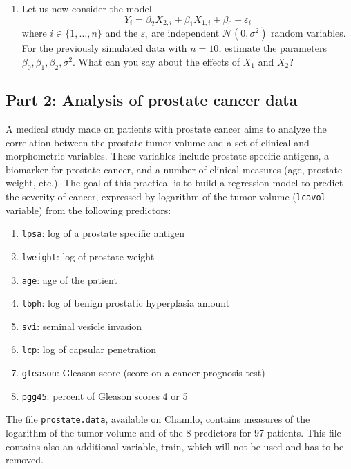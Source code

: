 \documentclass[12pt,a4paper]{article}
\newcommand{\code}[1]{\texttt{#1}}
\begin{document}
\begin{enumerate}
\item Let us now consider the model
$$
Y_i = \beta_2 X_{2, i} + \beta_1 X_{1, i} + \beta_0 + \varepsilon_i
$$
where $i \in \{1,\dots, n\}$ and the $\varepsilon_i$ are independent $\mathcal{N}(0, \sigma^2)$ random variables. For the previously simulated data with $n = 10$, estimate the parameters $\beta_0, \beta_1, \beta_2, \sigma^2$. What can you say about the effects of $X_1$ and $X_2$?
\end{enumerate}

\newpage
\subsection*{Part 2: Analysis of prostate cancer data}

A medical study made on patients with prostate cancer aims to analyze the correlation
between the prostate tumor volume and a set of clinical and morphometric variables. These
variables include prostate specific antigens, a biomarker for prostate cancer, and a number of clinical measures (age, prostate weight, etc.). The goal of this practical is to build a regression model to predict the severity of cancer, expressed by logarithm of the tumor volume (\code{lcavol} variable) from the following predictors:
\begin{enumerate}
\itemsep0em
\item[] \code{lpsa}: log of a prostate specific antigen
\item[] \code{lweight}: log of prostate weight
\item[] \code{age}: age of the patient
\item[] \code{lbph}: log of benign prostatic hyperplasia amount
\item[] \code{svi}: seminal vesicle invasion
\item[] \code{lcp}: log of capsular penetration
\item[] \code{gleason}: Gleason score (score on a cancer prognosis test)
\item[] \code{pgg45}: percent of Gleason scores 4 or 5
\end{enumerate}
The file \code{prostate.data}, available on Chamilo, contains measures of the logarithm of the tumor volume and of the 8 predictors for 97 patients. This file contains also an additional variable, train, which will not be used and has to be removed.
\end{document}
